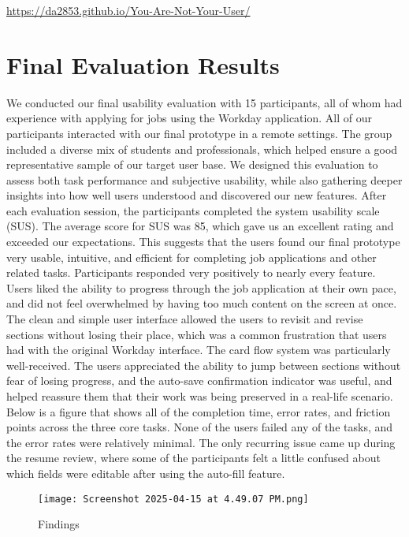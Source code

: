 \documentclass[
	letterpaper, %
]{jdf}
\begin{document}
\begin{sloppypar}
\begin{center}
    \url{https://da2853.github.io/You-Are-Not-Your-User/}
\end{center}

\newpage

\section{Final Evaluation Results}
We conducted our final usability evaluation with 15 participants, all of whom had experience with applying for jobs using the Workday application. All of our participants interacted with our final prototype in a remote settings. The group included a diverse mix of students and professionals, which helped ensure a good representative sample of our target user base. We designed this evaluation to assess both task performance and subjective usability, while also gathering deeper insights into how well users understood and discovered our new features. After each evaluation session, the participants completed the system usability scale (SUS). The average score for SUS was 85, which gave us an excellent rating and exceeded our expectations. This suggests that the users found our final prototype very usable, intuitive, and efficient for completing job applications and other related tasks. Participants responded very positively to nearly every feature. Users liked the ability to progress through the job application at their own pace, and did not feel overwhelmed by having too much content on the screen at once. The clean and simple user interface allowed the users to revisit and revise sections without losing their place, which was a common frustration that users had with the original Workday interface. The card flow system was particularly well-received. The users appreciated the ability to jump between sections without fear of losing progress, and the auto-save confirmation indicator was useful, and helped reassure them that their work was being preserved in a real-life scenario. Below is a figure that shows all of the completion time, error rates, and friction points across the three core tasks. None of the users failed any of the tasks, and the error rates were relatively minimal. The only recurring issue came up during the resume review, where some of the participants felt a little confused about which fields were editable after using the auto-fill feature.
\begin{figure}
    \centering
    \texttt{[image: Screenshot 2025-04-15 at 4.49.07 PM.png]}
    \caption{Findings}
    \label{fig:enter-label}
\end{figure}



\end{sloppypar}
\end{document}
